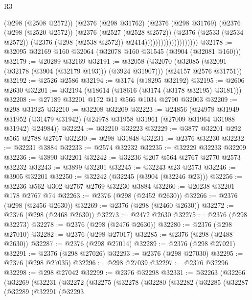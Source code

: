 \begin{lexlean}{R3}
\begin{coremodule}
                                (@298 (@2508 @2572))
                                (@2376
                                  (@298 @31762)
                                  (@2376
                                    (@298 @31769)
                                    (@2376
                                      (@298 (@2520 @2572))
                                      (@2376
                                        (@2527 (@2528 @2572))
                                        (@2376
                                          (@2533 (@2534 @2572))
                                          (@2376 (@298 (@2538 @2572)) @2414))))))))))))))))))))
@32178 := @32095 @32169 @160 @32064 (@32078 @160 @31545 (@3904 (@32081 @160)))
@32179 := @20289 @32169
@32191 := @32058
    (@32070 (@32085 (@32091 (@32178 (@3904 (@32179 @193))) (@3924 @31907))) (@24157 @2576 @31751))
@32192 := @2526 @2586
@32194 := @3174 (@18295 @32192)
@32195 := @2606 @2630
@32201 := @32194 (@18614 (@18616 (@3174 (@3178 @32195) @3181)))
@32208 := @27189 @32201 @172 @11 @566 @1034 @2790 @32003
@32209 := @298 @31925
@32210 := @32208 @32209
@32223 := @24856
    (@24978
      @31949
      @31952
      (@31479 @31942)
      (@24978 @31958 @31961 (@27009 @31964 @31988 @31942) @24984))
@32224 := @32210 @32223
@32229 := @3877 @32201 @292 @565 @2788 @2767
@32230 := @298 @31848
@32231 := @2376 @32230
@32232 := @32231 @3884
@32233 := @2574 @32232
@32235 := @32229 @32233 @32209
@32236 := @3890 @32201
@32242 := @32236 @207 @564 @2767 @2770 @2573 @32232
@32243 := @3899 @32201
@32245 := @32243 @23 @2573
@32246 := @3905 @32201
@32250 := @32242 (@32245 (@3904 (@32246 @23)))
@32256 := @32236 @562 @302 @2767 @2769 @32230 @3884
@32260 := @20238 @32201 @178 @2767 @74
@32263 := @2376 (@298 (@2452 @2630))
@32266 := @2376 (@298 (@2456 @2630))
@32269 := @2376 (@298 (@2460 @2630))
@32272 := @2376 (@298 (@2468 @2630))
@32273 := @2472 @2630
@32275 := @2376 (@298 @32273)
@32278 := @2376 (@298 (@2476 @2630))
@32280 := @2376 (@298 @27010)
@32282 := @2376 (@298 @27017)
@32285 := @2376 (@298 (@2488 @2630))
@32287 := @2376 (@298 @27014)
@32289 := @2376 (@298 @27021)
@32291 := @2376 (@298 @27026)
@32293 := @2376 (@298 @27030)
@32295 := @2376 (@298 @27035)
@32296 := @298 @27039
@32297 := @2376 @32296
@32298 := @298 @27042
@32299 := @2376 @32298
@32331 := @32263
    (@32266
      (@32269
        (@32231
          (@32272
            (@32275
              (@32278
                (@32280
                  (@32282
                    (@32285
                      (@32287
                        (@32289
                          (@32291
                            (@32293

\end{coremodule}
\end{lexlean}
